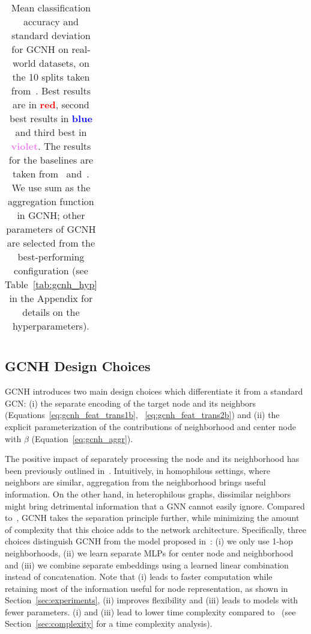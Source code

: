 \documentclass[conference]{IEEEtran}
\begin{document}
\begin{table*}[t]
\begin{tabular}{ c c c c c c c c c }
    \end{tabular}
    \caption{Mean classification accuracy and standard deviation for GCNH on real-world datasets, on the 10 splits taken from~\cite{pei_geom-gcn_2019}. Best results are in \textbf{\textcolor{red}{red}}, second best results in \textbf{\textcolor{blue}{blue}} and third best in \textbf{\textcolor{violet}{violet}}. The results for the baselines are taken from~\cite{yan_two_2021} and~\cite{bodnar_neural_2022}. We use sum as the aggregation function in GCNH; other parameters of GCNH are selected from the best-performing configuration (see Table~\ref{tab:gcnh_hyp} in the Appendix for details on the hyperparameters). }
    \label{tab:main_results}
\end{table*}



\subsection{GCNH Design Choices}
\label{sec:gcnh-design}

GCNH introduces two main design choices which differentiate it from a standard GCN: (i) the separate encoding of the target node and its neighbors (Equations~\ref{eq:gcnh_feat_trans1b}, ~\ref{eq:gcnh_feat_trans2b}) and (ii) the explicit parameterization of the contributions of neighborhood and center node with $\beta$ (Equation~\ref{eq:gcnh_aggr}). 

The positive impact of separately processing the node and its neighborhood has been previously outlined in~\cite{zhu_beyond_2020,suresh_breaking_2021}.
Intuitively, in homophilous settings, where neighbors are similar, aggregation from the neighborhood brings useful information. On the other hand, in heterophilous graphs, dissimilar neighbors might bring detrimental information that a GNN cannot easily ignore.
Compared to~\cite{zhu_beyond_2020}, GCNH takes the separation principle further, while minimizing the amount of complexity that this choice adds to the network architecture.
Specifically, three choices distinguish GCNH from the model proposed in~\cite{zhu_beyond_2020}: (i) we only use 1-hop neighborhoods, (ii) we learn separate MLPs for center node and neighborhood and (iii) we combine separate embeddings using a learned linear combination instead of concatenation.
Note that (i) leads to faster computation while retaining most of the information useful for node representation, as shown in Section~\ref{sec:experiments}, (ii) improves flexibility and (iii) leads to models with fewer parameters. (i) and (iii) lead to lower time complexity compared to~\cite{zhu_beyond_2020} (see Section~\ref{sec:complexity} for a time complexity analysis).
\end{document}
